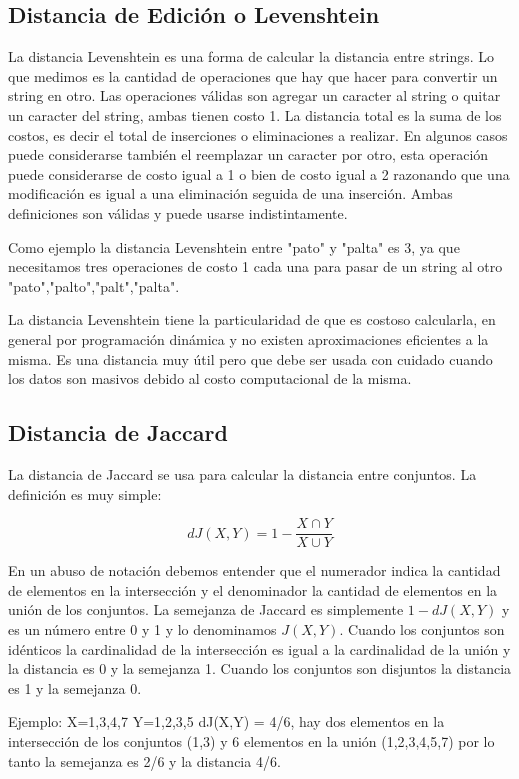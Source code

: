 \subsection{Distancia de Edición o Levenshtein}

La distancia Levenshtein es una forma de calcular la distancia entre strings. Lo que medimos es la cantidad de operaciones que hay que hacer para convertir un string en otro. Las operaciones válidas son agregar un caracter al string o quitar un caracter del string, ambas tienen costo 1. La distancia total es la suma de los costos, es decir el total de inserciones o eliminaciones a realizar. En algunos casos puede considerarse también el reemplazar un caracter por otro, esta operación puede considerarse de costo igual a 1 o bien de costo igual a 2 razonando que una modificación es igual a una eliminación seguida de una inserción. Ambas definiciones son válidas y puede usarse indistintamente.

Como ejemplo la distancia Levenshtein entre "pato" y "palta" es 3, ya que necesitamos tres operaciones de costo 1 cada una para pasar de un string al otro "pato","palto","palt","palta".

La distancia Levenshtein tiene la particularidad de que es costoso calcularla, en general por programación dinámica y no existen aproximaciones eficientes a la misma. Es una distancia muy útil pero que debe ser usada con cuidado cuando los datos son masivos debido al costo computacional de la misma.

\subsection{Distancia de Jaccard}

La distancia de Jaccard se usa para calcular la distancia entre conjuntos. La definición es muy simple:

$$dJ(X,Y) = 1-  \frac{X \cap Y}{X \cup Y}$$

En un abuso de notación debemos entender que el numerador indica la cantidad de elementos en la intersección y el denominador la cantidad de elementos en la unión de los conjuntos. 
La semejanza de Jaccard es simplemente $1-dJ(X,Y)$ y es un número entre 0 y 1 y lo denominamos $J(X,Y)$. Cuando los conjuntos son idénticos la cardinalidad de la intersección es igual a la cardinalidad de la unión y la distancia es 0 y la semejanza 1. Cuando los conjuntos son disjuntos la distancia es 1 y la semejanza 0.

Ejemplo: X={1,3,4,7} Y={1,2,3,5} dJ(X,Y) = 4/6, hay dos elementos en la intersección de los conjuntos (1,3) y 6 elementos en la unión (1,2,3,4,5,7) por lo tanto la semejanza es 2/6 y la distancia 4/6. 

